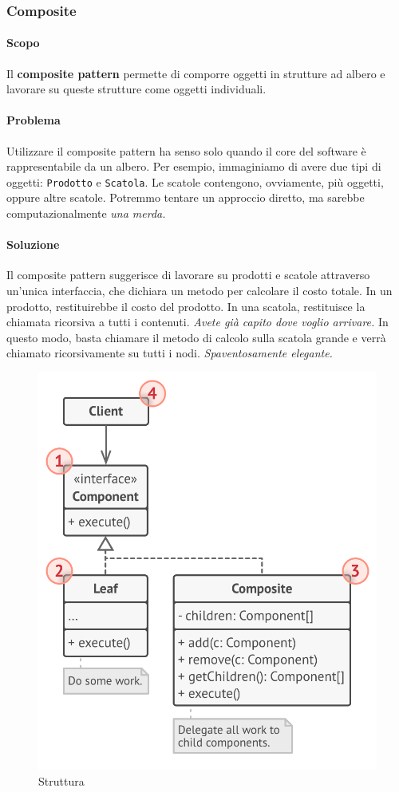 \documentclass[11pt]{article}
\newcommand{\code}[1]{\texttt{#1}}
\begin{document}
\subsubsection{Composite}
\paragraph{Scopo}
Il \textbf{composite pattern} permette di comporre oggetti in strutture ad albero e lavorare su queste strutture come oggetti individuali. 

\paragraph{Problema}
Utilizzare il composite pattern ha senso solo quando il core del software è rappresentabile da un albero. Per esempio, immaginiamo di avere due tipi di oggetti: \code{Prodotto} e \code{Scatola}. Le scatole contengono, ovviamente, più oggetti, oppure altre scatole. Potremmo tentare un approccio diretto, ma sarebbe computazionalmente \textit{una merda.}
\paragraph{Soluzione}
Il composite pattern suggerisce di lavorare su prodotti e scatole attraverso un'unica interfaccia, che dichiara un metodo per calcolare il costo totale. In un prodotto, restituirebbe il costo del prodotto. In una scatola, restituisce la chiamata ricorsiva a tutti i contenuti. \textit{Avete già capito dove voglio arrivare.} In questo modo, basta chiamare il metodo di calcolo sulla scatola grande e verrà chiamato ricorsivamente su tutti i nodi. \textit{Spaventosamente elegante.}
\begin{figure}[H]
    \centering
    \includegraphics[width=0.6\linewidth]{res/teoria/Composite.png}
    \caption{Struttura}
\end{figure}
\end{document}
